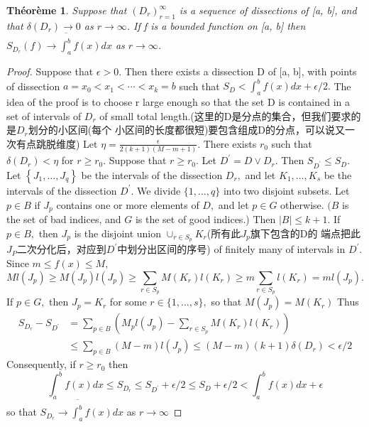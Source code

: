 \documentclass[12pt]{book}
\theoremstyle{definition}\newtheorem{dfn}{Définition}[chapter]
\theoremstyle{plain}\newtheorem{thm}{Théorème}[chapter]
\theoremstyle{plain}\newtheorem{prp}{Proposition}[chapter]
\theoremstyle{plain}\newtheorem{lem}{\bf Lemme}[chapter]
\theoremstyle{plain}\newtheorem{axm}{\bf Axiome}[chapter]
\theoremstyle{plain}\newtheorem{lmm}{\bf Lemme}[chapter]
\theoremstyle{plain}\newtheorem{exm}{\bf Example}[chapter]
\theoremstyle{plain}\newtheorem{cor}{\bf Corollaire}[chapter]
\theoremstyle{remark}\newtheorem{rem}{Remarque}[chapter]
\begin{document}
\begin{thm}
Suppose that $(D_r)^{\infty}_{r=1}$ is a sequence of dissections of [a, b],
and that $\delta(D_r) \to 0$ as $r \to \infty$. If f is a bounded function on [a, b] then
$S_{D_r}(f) \to\overline{\int^b_a} f(x) d x$ as $r\to\infty$.
\end{thm}
\begin{proof}
Suppose that $\epsilon > 0$. Then there exists a dissection D of [a, b],
with points of dissection $a = x_0 < x_1 < \cdots < x_k = b$ such that
$S_D <\int^b_a f(x) dx + \epsilon/2.$ The idea of the proof is to choose r large enough so
that the set D is contained in a set of intervals of $D_r$ of small
total length.(这里的D是分点的集合，但我们要求的是$D_r$划分的小区间(每个
小区间的长度都很短)要包含组成D的分点，可以说又一次有点跳脱维度) Let
$\eta = \frac{\epsilon}{2(k + 1)(M − m + 1)}$. There exists $r_0$ such that $\delta(D_r) < \eta$ for $r \ge r_0$.
Suppose that $r \geq r_{0} .$ Let $D^{\prime}=D \vee D_{r} .$ Then $S_{D^{\prime}} \leq S_{D} .$ Let $\left\{J_{1}, \ldots, J_{q}\right\}$
be the intervals of the dissection $D_{r},$ and let $K_{1}, \ldots,
K_{s}$ be the intervals of the dissection $D^{\prime} .$ We divide
$\{1, \ldots, q\}$ into two disjoint subsets. Let $p \in B$ if $J_{p}$
contains one or more elements of $D,$ and let $p \in G$
otherwise. $(B$ is the set of bad indices, and $G$ is the set of good
indices.) Then $|B| \leq k+1$. If $p \in B,$ then $J_{p}$ is the
disjoint union $\cup_{r \in S_{p}} K_{r}$(所有此$J_p$旗下包含的D的
端点把此$J_P$二次分化后，对应到$D^{\prime}$中划分出区间的序号) of finitely many of
intervals in $D^{\prime} .$  Since $m \le f(x) \le M,$
$$M l\left(J_{p}\right) \geq M\left(J_{p}\right) l\left(J_{p}\right) \geq \sum_{r \in S_{p}} M\left(K_{r}\right) l\left(K_{r}\right) \geq m \sum_{r \in S_{p}} l\left(K_{r}\right)=m l\left(J_{p}\right) .
$$
If $p \in G,$ then $J_{p}=K_{r}$ for some $r \in\{1, \ldots, s\},$ so that $M\left(J_{p}\right)=M\left(K_{r}\right)$ Thus
$$
\begin{aligned}
S_{D_{r}}-S_{D^{\prime}} &\left.=\sum_{p \in
    B} \left(M_{p}l\left(J_{p}\right)-\sum_{r \in S_{p}}
    M\left(K_{r}\right) l(K_{r}) \right)\right. \\
& \leq \sum_{p \in B}(M-m) l\left(J_{p}\right) \leq(M-m)(k+1) \delta\left(D_{r}\right)<\epsilon / 2
\end{aligned}
$$
Consequently, if $r \geq r_{0}$ then
$$
\int_{a}^{b} f(x) d x \leq S_{D_{r}} \leq S_{D^{\prime}}+\epsilon / 2 \leq S_{D}+\epsilon / 2<\int_{a}^{b} f(x) d x+\epsilon
$$
so that $S_{D_{r}} \rightarrow \overline{\int_{a}^{b}} f(x) d x$ as $r
\rightarrow \infty$


\end{proof}
\end{document}
